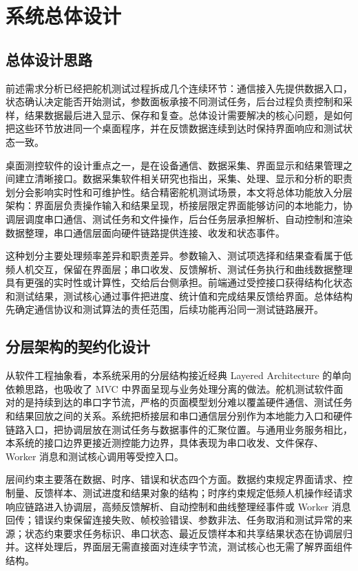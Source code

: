 \chapter{系统总体设计}

\section{总体设计思路}

前述需求分析已经把舵机测试过程拆成几个连续环节：通信接入先提供数据入口，状态确认决定能否开始测试，参数面板承接不同测试任务，后台过程负责控制和采样，结果数据最后进入显示、保存和复查。总体设计需要解决的核心问题，是如何把这些环节放进同一个桌面程序，并在反馈数据连续到达时保持界面响应和测试状态一致。

桌面测控软件的设计重点之一，是在设备通信、数据采集、界面显示和结果管理之间建立清晰接口\cite{zhang2017qtflowmeter}。数据采集软件相关研究也指出，采集、处理、显示和分析的职责划分会影响实时性和可维护性\cite{stansbury2023autodidaqt,turkmanovic2023highspeed}。结合精密舵机测试场景，本文将总体功能放入分层架构：界面层负责操作输入和结果呈现，桥接层限定界面能够访问的本地能力，协调层调度串口通信、测试任务和文件操作，后台任务层承担解析、自动控制和渲染数据整理，串口通信层面向硬件链路提供连接、收发和状态事件。

这种划分主要处理频率差异和职责差异。参数输入、测试项选择和结果查看属于低频人机交互，保留在界面层；串口收发、反馈解析、测试任务执行和曲线数据整理具有更强的实时性或计算性，交给后台侧承担。前端通过受控接口获得结构化状态和测试结果，测试核心通过事件把进度、统计值和完成结果反馈给界面。总体结构先确定通信协议和测试算法的责任范围，后续功能再沿同一测试链路展开。

\section{分层架构的契约化设计}

从软件工程抽象看，本系统采用的分层结构接近经典 Layered Architecture 的单向依赖思路，也吸收了 MVC 中界面呈现与业务处理分离的做法。舵机测试软件面对的是持续到达的串口字节流，严格的页面模型划分难以覆盖硬件通信、测试任务和结果回放之间的关系。系统把桥接层和串口通信层分别作为本地能力入口和硬件链路入口，把协调层放在测试任务与数据事件的汇聚位置。与通用业务服务相比，本系统的接口边界更接近测控能力边界，具体表现为串口收发、文件保存、Worker 消息和测试核心调用等受控入口。

层间约束主要落在数据、时序、错误和状态四个方面。数据约束规定界面请求、控制量、反馈样本、测试进度和结果对象的结构；时序约束规定低频人机操作经请求响应链路进入协调层，高频反馈解析、自动控制和曲线整理经事件或 Worker 消息回传；错误约束保留连接失败、帧校验错误、参数非法、任务取消和测试异常的来源；状态约束要求任务标识、串口状态、最近反馈样本和共享结果状态在协调层归并。这样处理后，界面层无需直接面对连续字节流，测试核心也无需了解界面组件结构。

